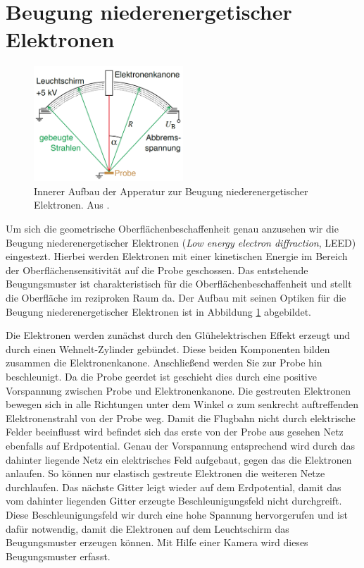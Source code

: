     \section{Beugung niederenergetischer Elektronen} \label{sec:LEED}
        \begin{figure}
            \centering
            \includegraphics[width=0.5\textwidth]{./content/LEED.PNG}
            \caption{Innerer Aufbau der Apperatur zur Beugung niederenergetischer Elektronen. Aus \cite{Fauster}.}
            \label{fig:LEED}
        \end{figure}
        Um sich die geometrische Oberflächenbeschaffenheit genau anzusehen wir die Beugung niederenergetischer Elektronen (\textit{Low energy electron diffraction}, LEED) eingestezt.
        Hierbei werden Elektronen mit einer kinetischen Energie im Bereich der Oberflächensensitivität auf die Probe geschossen.
        Das entstehende Beugungsmuster ist charakteristisch für die Oberflächenbeschaffenheit und stellt die Oberfläche im reziproken Raum da.
        Der Aufbau mit seinen Optiken für die Beugung niederenergetischer Elektronen ist in Abbildung \ref{fig:LEED} abgebildet.
        
        Die Elektronen werden zunächst durch den Glühelektrischen Effekt erzeugt und durch einen Wehnelt-Zylinder gebündet.
        Diese beiden Komponenten bilden zusammen die Elektronenkanone.
        Anschließend werden Sie zur Probe hin beschleunigt.
        Da die Probe geerdet ist geschieht dies durch eine positive Vorspannung zwischen Probe und Elektronenkanone.
        Die gestreuten Elektronen bewegen sich in alle Richtungen unter dem Winkel $\alpha$ zum senkrecht auftreffenden Elektronenstrahl von der Probe weg.
        Damit die Flugbahn nicht durch elektrische Felder beeinflusst wird befindet sich das erste von der Probe aus gesehen Netz ebenfalls auf Erdpotential.
        Genau der Vorspannung entsprechend wird durch das dahinter liegende Netz  ein elektrisches Feld aufgebaut, gegen das die Elektronen anlaufen.
        So können nur elastisch gestreute Elektronen die weiteren Netze durchlaufen.
        Das nächste Gitter leigt wieder auf dem Erdpotential, damit das vom dahinter liegenden Gitter erzeugte Beschleunigungsfeld nicht durchgreift.
        Diese Beschleunigungsfeld wir durch eine hohe Spannung hervorgerufen und ist dafür notwendig, damit die Elektronen auf dem Leuchtschirm das Beugungsmuster erzeugen können.
        Mit Hilfe einer Kamera wird dieses Beugungsmuster erfasst.

